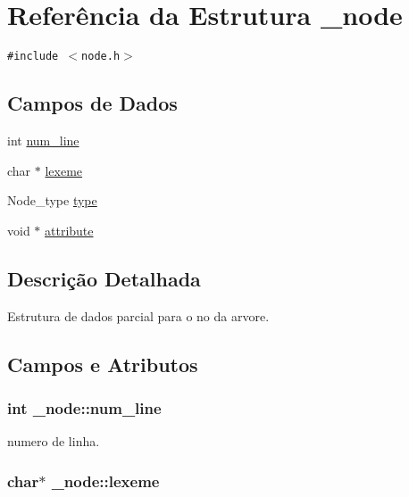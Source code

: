 \hypertarget{struct__node}{
\section{Referência da Estrutura \_\-node}
\label{struct__node}
}
{\tt \#include $<$node.h$>$}

\subsection*{Campos de Dados}
\begin{CompactItemize}
\item 
int \hyperlink{struct__node_d9586487581d158778b8ec89f2fb321d}{num\_\-line}
\item 
char $\ast$ \hyperlink{struct__node_d88ded3f26dc3e6469372e4740cefba7}{lexeme}
\item 
Node\_\-type \hyperlink{struct__node_7d8402191946be24896b7517484c2d0b}{type}
\item 
void $\ast$ \hyperlink{struct__node_8635514c1a76f9660692563ea9bb8ef1}{attribute}
\end{CompactItemize}


\subsection{Descrição Detalhada}
Estrutura de dados parcial para o no da arvore. 

\subsection{Campos e Atributos}
\hypertarget{struct__node_d9586487581d158778b8ec89f2fb321d}{
\subsubsection{\setlength{\rightskip}{0pt plus 5cm}int {\bf \_\-node::num\_\-line}}}
\label{struct__node_d9586487581d158778b8ec89f2fb321d}


numero de linha. \hypertarget{struct__node_d88ded3f26dc3e6469372e4740cefba7}{
\subsubsection{\setlength{\rightskip}{0pt plus 5cm}char$\ast$ {\bf \_\-node::lexeme}}}
\label{struct__node_d88ded3f26dc3e6469372e4740cefba7}


